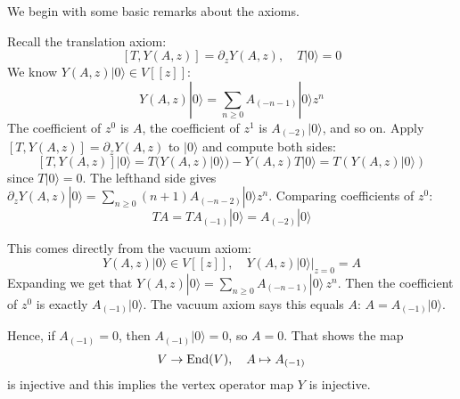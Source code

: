\documentclass[12pt]{article}
\begin{document}
We begin with some basic remarks about the axioms.
\begin{remark}
    [$T$ is determined by $Y$] Recall the translation axiom:
    \[[T, Y(A,z)] = \partial_z Y(A,z), \quad T|0\rangle = 0\]
    We know $Y(A,z)|0\rangle \in V[[z]]$:
    \[Y(A,z)|0\rangle = \sum_{n\ge 0} A_{(-n-1)}|0\rangle z^n \]
    The coefficient of $z^0$ is $A$, the coefficient of $z^1$ is $A_{(-2)}|0\rangle$, and so on. Apply $[T,Y(A,z)] = \partial_z Y(A,z)$ to $|0\rangle$ and compute both sides:
    \[[T, Y(A,z)]|0\rangle = T(Y(A,z)|0\rangle) - Y(A,z)T|0\rangle = T(Y(A,z)|0\rangle)\]
    since $T|0\rangle=0$.
    The lefthand side gives
    $\partial_z Y(A,z)|0\rangle = \sum_{n\ge 0} (n+1)A_{(-n-2)}|0\rangle z^n$. Comparing coefficients of $z^0$:
    \[TA = T A_{(-1)}|0\rangle = A_{(-2)}|0\rangle\]
\end{remark}

\begin{remark}[$Y$ is injective]
    This comes directly from the vacuum axiom:
    \[Y(A,z)|0\rangle \in V[[z]], \quad Y(A,z)|0\rangle\big|_{z=0} = A\]
    Expanding we get that $Y(A,z)|0\rangle = \sum_{n\ge 0} A_{(-n-1)}|0\rangle\,z^n$.
    Then the coefficient of $z^0$ is exactly $A_{(-1)}|0\rangle$.
    The vacuum axiom says this equals $A$:
    $A = A_{(-1)}|0\rangle$.

    Hence, if $A_{(-1)} = 0$, then $A_{(-1)}|0\rangle = 0$, so $A=0$.
    That shows the map
    \[
        V \to \operatorname{End}(V), \quad A \mapsto A_{(-1)}
    \]
    is injective and this implies the vertex operator map $Y$ is injective.
\end{remark}
\end{document}
